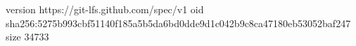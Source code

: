 version https://git-lfs.github.com/spec/v1
oid sha256:5275b993cbf51140f185a5b5da6bd0dde9d1c042b9c8ca47180eb53052baf247
size 34733
